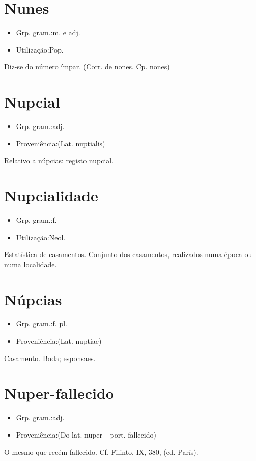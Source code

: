 \section{Nunes}
\begin{itemize}
\item {Grp. gram.:m.  e  adj.}
\end{itemize}
\begin{itemize}
\item {Utilização:Pop.}
\end{itemize}
Diz-se do número ímpar.
(Corr. de \textunderscore nones\textunderscore . Cp. \textunderscore nones\textunderscore )
\section{Nupcial}
\begin{itemize}
\item {Grp. gram.:adj.}
\end{itemize}
\begin{itemize}
\item {Proveniência:(Lat. \textunderscore nuptialis\textunderscore )}
\end{itemize}
Relativo a núpcias: \textunderscore registo nupcial\textunderscore .
\section{Nupcialidade}
\begin{itemize}
\item {Grp. gram.:f.}
\end{itemize}
\begin{itemize}
\item {Utilização:Neol.}
\end{itemize}
Estatística de casamentos.
Conjunto dos casamentos, realizados numa época ou numa localidade.
\section{Núpcias}
\begin{itemize}
\item {Grp. gram.:f. pl.}
\end{itemize}
\begin{itemize}
\item {Proveniência:(Lat. \textunderscore nuptiae\textunderscore )}
\end{itemize}
Casamento.
Boda; esponsaes.
\section{Nuper-fallecido}
\begin{itemize}
\item {Grp. gram.:adj.}
\end{itemize}
\begin{itemize}
\item {Proveniência:(Do lat. \textunderscore nuper\textunderscore  + port. \textunderscore fallecido\textunderscore )}
\end{itemize}
O mesmo que \textunderscore recém-fallecido\textunderscore . Cf. Filinto, IX, 380, (ed. París).

